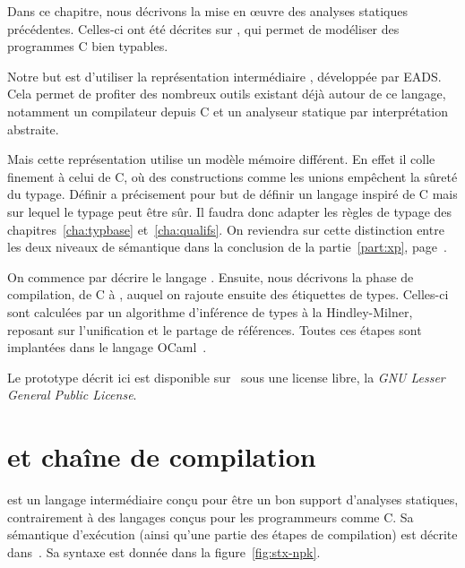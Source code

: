 Dans ce chapitre, nous décrivons la mise en œuvre des analyses statiques
précédentes.
Celles-ci ont été décrites sur \langname, qui permet de modéliser des programmes
C bien typables.

Notre but est d'utiliser la représentation intermédiaire \newspeak, développée
par EADS. Cela permet de profiter des nombreux outils existant déjà autour de ce
langage, notamment un compilateur depuis C et un analyseur statique par
interprétation abstraite.

Mais cette représentation utilise un modèle mémoire différent. En effet il
colle finement à celui de C, où des constructions comme les unions empêchent la
sûreté du typage. Définir \langname a précisement pour but de définir un langage
inspiré de C mais sur lequel le typage peut être sûr. Il faudra donc adapter les
règles de typage des chapitres~\ref{cha:typbase} et~\ref{cha:qualifs}. On
reviendra sur cette distinction entre les deux niveaux de sémantique dans la
conclusion de la partie~\ref{part:xp}, page~\pageref{page:ccl-npk-spk}.

On commence par décrire le langage \newspeak. Ensuite, nous décrivons la phase
de compilation, de C à \newspeak, auquel on rajoute ensuite des étiquettes de
types. Celles-ci sont calculées par un algorithme d'inférence de types à la
Hindley-Milner, reposant sur l'unification et le partage de références. Toutes
ces étapes sont implantées dans le langage OCaml~\cite{ocamlManual,DAOC}.

Le prototype décrit ici est disponible sur~ sous une license
libre, la \emph{GNU Lesser General Public License}.

\section{\newspeak et chaîne de compilation}
\label{sec:compil}

\newspeak est un langage intermédiaire conçu pour être un bon support d'analyses
statiques, contrairement à des langages conçus pour les programmeurs comme C. Sa
sémantique d'exécution (ainsi qu'une partie des étapes de compilation)
est décrite dans~\cite{newspeak}. Sa syntaxe est donnée dans la
figure~\ref{fig:stx-npk}.

